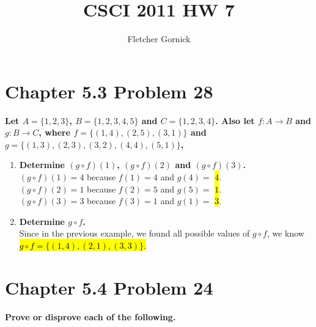 \documentclass[10pt]{article}
\title{CSCI 2011 HW 7}
\author{Fletcher Gornick}
\begin{document}
\maketitle

\section{Chapter 5.3 Problem 28}
\textbf{Let $A = \{1,2,3\}$, $B = \{1,2,3,4,5\}$ and $C = \{1,2,3,4\}$.  Also let $f: A \to B$ and $g: B \to C$,
where $f = \{(1,4), (2,5), (3,1)\}$ and $g = \{(1,3), (2,3), (3,2), (4,4), (5,1)\}$,}

\begin{enumerate}[label=(\alph*)]

    \item \textbf{Determine $(g \circ f)(1)$, $(g \circ f)(2)$ and $(g \circ f)(3)$.} \\
        $(g \circ f)(1) = 4$ because $f(1) = 4$ and $g(4) =$ \hl{$4$}. \\
        $(g \circ f)(2) = 1$ because $f(2) = 5$ and $g(5) =$ \hl{$1$}. \\
        $(g \circ f)(3) = 3$ because $f(3) = 1$ and $g(1) =$ \hl{$3$}. 

    \item \textbf{Determine $g \circ f$.} \\
        Since in the previous example, we found all possible values of $g \circ f$, we know \hl{$g \circ f = \{(1,4), (2,1), (3,3)\}$.}

\end{enumerate}



\section{Chapter 5.4 Problem 24}
\textbf{Prove or disprove each of the following.}
\end{document}
